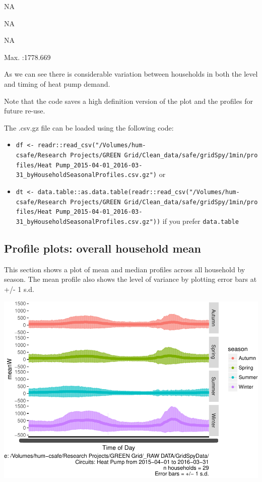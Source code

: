 \documentclass[]{article}
\providecommand{\tightlist}{%
  \setlength{\itemsep}{0pt}\setlength{\parskip}{0pt}}
\begin{document}
NA

NA

NA

Max. :1778.669

As we can see there is considerable variation between households in both
the level and timing of heat pump demand.

Note that the code saves a high definition version of the plot and the
profiles for future re-use.

The .csv.gz file can be loaded using the following code:

\begin{itemize}
\tightlist
\item
  \texttt{df\ \textless{}-\ readr::read\_csv("/Volumes/hum-csafe/Research\ Projects/GREEN\ Grid/Clean\_data/safe/gridSpy/1min/profiles/Heat\ Pump\_2015-04-01\_2016-03-31\_byHouseholdSeasonalProfiles.csv.gz")}
  or
\item
  \texttt{dt\ \textless{}-\ data.table::as.data.table(readr::read\_csv("/Volumes/hum-csafe/Research\ Projects/GREEN\ Grid/Clean\_data/safe/gridSpy/1min/profiles/Heat\ Pump\_2015-04-01\_2016-03-31\_byHouseholdSeasonalProfiles.csv.gz"))}
  if you prefer \texttt{data.table}
\end{itemize}

\subsection{Profile plots: overall household
mean}\label{profile-plots-overall-household-mean}

This section shows a plot of mean and median profiles across all
household by season. The mean profile also shows the level of variance
by plotting error bars at +/- 1 s.d.

\includegraphics{ggProfile_Heat Pump_2015-04-01_2016-03-31_files/figure-latex/overall profiles by season-1.pdf}
\end{document}
